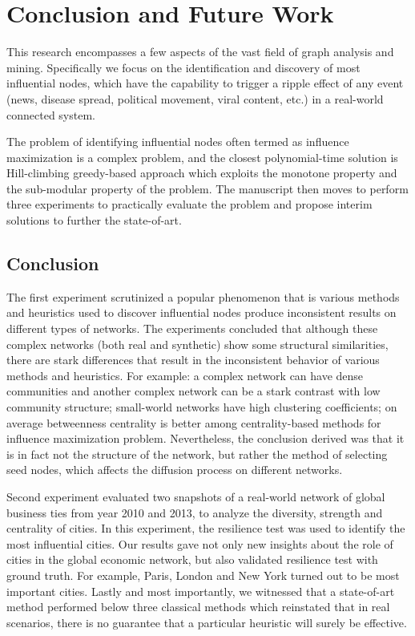 \chapter{Conclusion and Future Work}
\label{chp:conclusion}

This research encompasses a few aspects of the vast field of graph analysis and mining. Specifically we focus on the identification and discovery of most influential nodes, which have the capability to trigger a ripple effect of any event (news, disease spread, political movement, viral content, etc.) in a real-world connected system.

The problem of identifying influential nodes often termed as influence maximization is a complex problem, and the closest polynomial-time solution is Hill-climbing greedy-based approach which exploits the monotone property and the sub-modular property of the problem. The manuscript then moves to perform three experiments to practically evaluate the problem and propose interim solutions to further the state-of-art.

	\section{Conclusion}
	The first experiment scrutinized a popular phenomenon that is various methods and heuristics used to discover influential nodes produce  inconsistent results on different types of networks. The experiments concluded that although these complex networks (both real and synthetic) show some structural similarities, there are stark differences that result in the inconsistent behavior of various methods and heuristics. For example: a complex network can have dense communities and another complex network can be a stark contrast with low community structure; small-world networks have high clustering coefficients; on average betweenness centrality is better among centrality-based methods for influence maximization problem. Nevertheless, the conclusion derived was that it is in fact not the structure of the network, but rather the method of selecting seed nodes, which affects the diffusion process on different networks.
	
	Second experiment evaluated two snapshots of a real-world network of global business ties from year 2010 and 2013, to analyze the diversity, strength and centrality of cities. In this experiment, the resilience test was used to identify the most influential cities. Our results gave not only new insights about the role of cities in the global economic network, but also validated resilience test with ground truth. For example, Paris, London and New York turned out to be most important cities. Lastly and most importantly, we witnessed that a state-of-art method performed below three classical methods which reinstated that in real scenarios, there is no guarantee that a particular heuristic will surely be effective.
	
